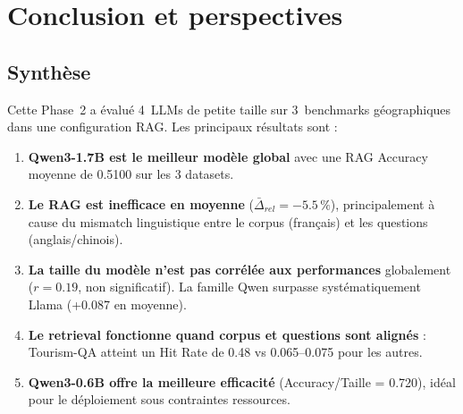 \documentclass[12pt,a4paper]{article}
\begin{document}
\section{Conclusion et perspectives}
\label{sec:conclusion}

\subsection{Synth\`ese}

Cette Phase~2 a \'evalu\'e 4~LLMs de petite taille sur 3~benchmarks g\'eographiques dans une
configuration RAG. Les principaux r\'esultats sont :

\begin{enumerate}[leftmargin=*]
  \item \textbf{Qwen3-1.7B est le meilleur mod\`ele global} avec une RAG Accuracy moyenne
  de 0.5100 sur les 3 datasets.
  \item \textbf{Le RAG est inefficace en moyenne} ($\bar{\Delta}_{rel} = -5.5\,\%$),
  principalement \`a cause du mismatch linguistique entre le corpus (fran\c{c}ais) et les
  questions (anglais/chinois).
  \item \textbf{La taille du mod\`ele n'est pas corr\'el\'ee aux performances} globalement
  ($r = 0.19$, non significatif). La famille Qwen surpasse syst\'ematiquement Llama
  (+0.087 en moyenne).
  \item \textbf{Le retrieval fonctionne quand corpus et questions sont align\'es} :
  Tourism-QA atteint un Hit Rate de 0.48 vs 0.065--0.075 pour les autres.
  \item \textbf{Qwen3-0.6B offre la meilleure efficacit\'e} (Accuracy/Taille = 0.720),
  id\'eal pour le d\'eploiement sous contraintes ressources.
\end{enumerate}
\end{document}
